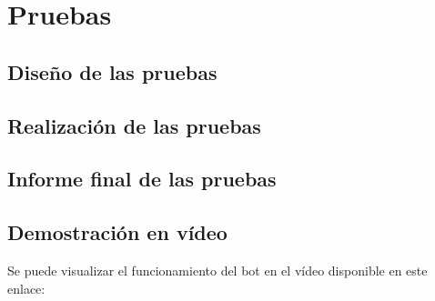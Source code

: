 \chapter{Pruebas}











\section{Diseño de las pruebas}


\section{Realización de las pruebas}


\section{Informe final de las pruebas}


\section{Demostración en vídeo}

Se puede visualizar el funcionamiento del bot en el vídeo disponible en este enlace:
\url{}

